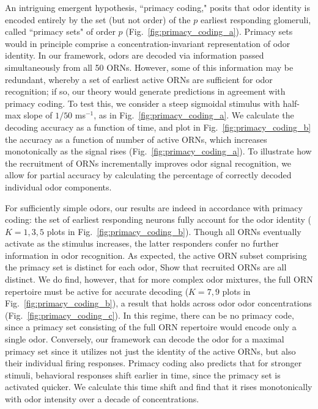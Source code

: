 \documentclass[9pt,twocolumn,twoside,lineno]{pnas-new}
\begin{document}
An intriguing emergent hypothesis, ``primacy coding,"  posits that odor identity is encoded entirely by the set (but not order) of the $p$ earliest responding glomeruli, called ``primacy sets" of order $p$ (Fig.~\ref{fig:primacy_coding_a}). Primacy sets would in principle comprise a concentration-invariant representation of odor identity. In our framework, odors are decoded via information passed simultaneously from all 50 ORNs. However, some of this information may be redundant, whereby a set of earliest active ORNs are sufficient for odor recognition; if so, our theory would generate predictions in agreement with primacy coding. To test this, we consider a steep sigmoidal stimulus with half-max slope of $1/50$ ms$^{-1}$, as in Fig.~\ref{fig:primacy_coding_a}. We calculate the decoding accuracy as a function of time, and plot in Fig.~\ref{fig:primacy_coding_b} the accuracy as a function of number of active ORNs, which increases monotonically as the signal rises (Fig.~\ref{fig:primacy_coding_a}). To illustrate how the recruitment of ORNs incrementally improves odor signal recognition, we allow for partial accuracy by calculating  the percentage of correctly decoded individual odor components.

For sufficiently simple odors, our results are indeed in accordance with primacy coding: the set of earliest responding neurons fully account for the odor identity ($K=1, 3, 5$ plots in Fig.~\ref{fig:primacy_coding_b}). Though all ORNs eventually activate as the stimulus increases, the latter responders confer no further information in odor recognition. As expected, the active ORN subset comprising the primacy set is distinct for each odor,   {\color{blue} Show that recruited ORNs are all distinct}. We do find, however, that for more complex odor mixtures, the full ORN repertoire must be active for  accurate decoding ($K=7, 9$ plots in Fig.~\ref{fig:primacy_coding_b}), a result that holds across odor  odor concentrations (Fig.~\ref{fig:primacy_coding_c}). In this regime, there can  be no primacy code, since a primacy set consisting of the full ORN repertoire would encode only a single odor. Conversely, our framework can decode the odor for a maximal primacy set since it utilizes not just the identity of the active ORNs, but also their individual firing responses. Primacy coding also predicts that for stronger stimuli, behavioral responses shift earlier in time, since the primacy set is activated quicker. We calculate this time shift and find that it rises monotonically with odor intensity over a decade of concentrations.  %
\end{document}
